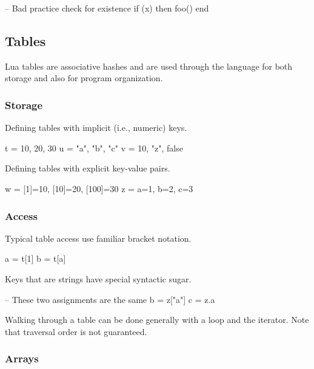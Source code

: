\begin{LuaCode}
-- Bad practice check for existence
if (x) then
	foo()
end
\end{LuaCode}

\subsection{Tables}

Lua tables are associative hashes and are used through the language for both
storage and also for program organization.

\subsubsection{Storage}

Defining tables with implicit (i.e., numeric) keys.

\begin{LuaCode}
t = { 10, 20, 30 }
u = { "a", "b", "c" }
v = { 10, "z", false }
\end{LuaCode}

Defining tables with explicit key-value pairs.

\begin{LuaCode}
w = { [1]=10, [10]=20, [100]=30 }
z = { a=1, b=2, c=3 }
\end{LuaCode}

\subsubsection{Access}

Typical table access use familiar bracket notation.

\begin{LuaCode}
a = t[1]
b = t[a]
\end{LuaCode}

Keys that are strings have special syntactic sugar.

\begin{LuaCode}
-- These two assignments are the same
b = z["a"]
c = z.a
\end{LuaCode}

Walking through a table can be done generally with a  loop and the
 iterator.  Note that traversal order is not guaranteed.

\subsubsection{Arrays}

